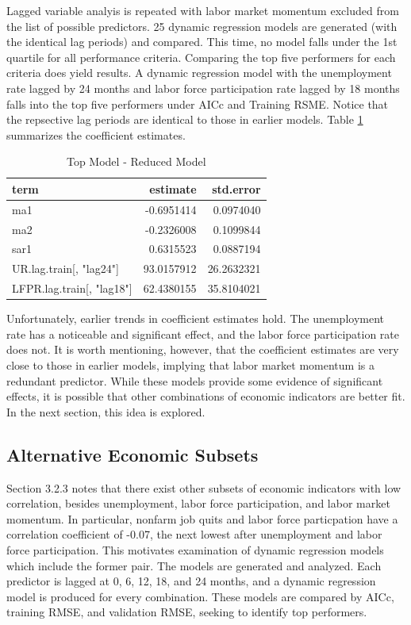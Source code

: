 \documentclass[12pt,letterpaper,toc=flat,oneside]{report}
\theoremstyle{definition}
\theoremstyle{definition}
\theoremstyle{definition}
\theoremstyle{remark}
\begin{document}
Lagged variable analyis is repeated with labor market momentum excluded
from the list of possible predictors. 25 dynamic regression models are
generated (with the identical lag periods) and compared. This time, no
model falls under the 1st quartile for all performance criteria.
Comparing the top five performers for each criteria does yield results.
A dynamic regression model with the unemployment rate lagged by 24
months and labor force participation rate lagged by 18 months falls into
the top five performers under AICc and Training RSME. Notice that the
repsective lag periods are identical to those in earlier models. Table
\ref{tab:reduced-1} summarizes the coefficient estimates.

\begin{table}[!h]

\caption{\label{tab:reduced-1}Top Model - Reduced Model}
\centering
\begin{tabular}[t]{lrr}
\toprule
\bfseries{term} & \bfseries{estimate} & \bfseries{std.error}\\
\midrule
ma1 & -0.6951414 & 0.0974040\\
ma2 & -0.2326008 & 0.1099844\\
sar1 & 0.6315523 & 0.0887194\\
UR.lag.train[, "lag24"] & 93.0157912 & 26.2632321\\
LFPR.lag.train[, "lag18"] & 62.4380155 & 35.8104021\\
\bottomrule
\end{tabular}
\end{table}

Unfortunately, earlier trends in coefficient estimates hold. The
unemployment rate has a noticeable and significant effect, and the labor
force participation rate does not. It is worth mentioning, however, that
the coefficient estimates are very close to those in earlier models,
implying that labor market momentum is a redundant predictor. While
these models provide some evidence of significant effects, it is
possible that other combinations of economic indicators are better fit.
In the next section, this idea is explored.

\hypertarget{alternative-economic-subsets}{%
\subsection{Alternative Economic
Subsets}\label{alternative-economic-subsets}}

Section 3.2.3 notes that there exist other subsets of economic
indicators with low correlation, besides unemployment, labor force
participation, and labor market momentum. In particular, nonfarm job
quits and labor force particpation have a correlation coefficient of
-0.07, the next lowest after unemployment and labor force participation.
This motivates examination of dynamic regression models which include
the former pair. The models are generated and analyzed. Each predictor
is lagged at 0, 6, 12, 18, and 24 months, and a dynamic regression model
is produced for every combination. These models are compared by AICc,
training RMSE, and validation RMSE, seeking to identify top performers.
\end{document}
